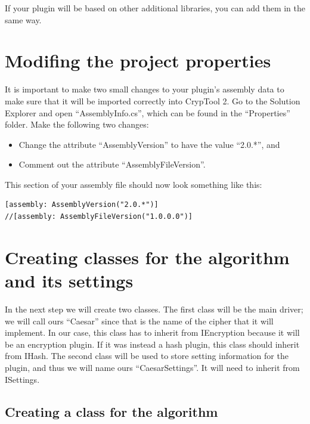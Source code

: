 \noindent If your plugin will be based on other additional libraries, you can add them in the same way.

\section{Modifing the project properties}
\label{sec:ModifyTheProjectProperties}

It is important to make two small changes to your plugin's assembly data to make sure that it will be imported correctly into CrypTool 2. Go to the Solution Explorer and open ``AssemblyInfo.cs'', which can be found in the ``Properties'' folder. Make the following two changes:

\begin{itemize}
	\item Change the attribute ``AssemblyVersion'' to have the value ``2.0.*'', and
	\item Comment out the attribute ``AssemblyFileVersion''.
\end{itemize}

\noindent This section of your assembly file should now look something like this:

\begin{lstlisting}
[assembly: AssemblyVersion("2.0.*")]
//[assembly: AssemblyFileVersion("1.0.0.0")]
\end{lstlisting}

\section{Creating classes for the algorithm and its settings}
\label{sec:CreatingClassesForTheAlgorithmAndItsSettings}

In the next step we will create two classes. The first class will be the main driver; we will call ours ``Caesar'' since that is the name of the cipher that it will implement. In our case, this class has to inherit from IEncryption because it will be an encryption plugin. If it was instead a hash plugin, this class should inherit from IHash. The second class will be used to store setting information for the plugin, and thus we will name ours ``CaesarSettings''. It will need to inherit from ISettings.
\clearpage

\subsection{Creating a class for the algorithm}
\label{sec:CreatingAClassForTheAlgorithm}

